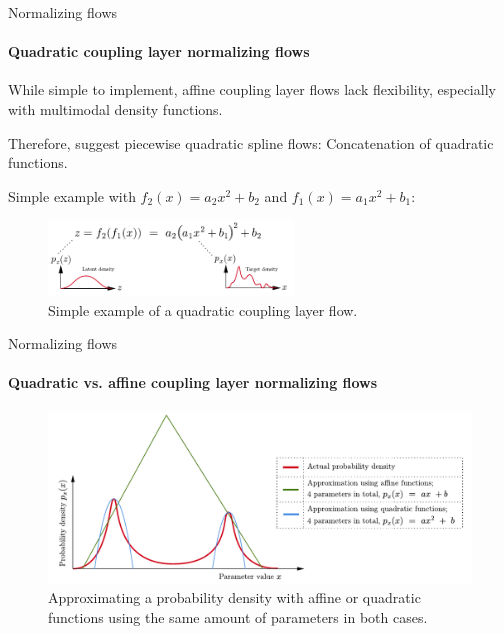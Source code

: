 \documentclass{beamer}
\begin{document}
\begin{frame}[allowframebreaks]{Normalizing flows}
	\framesubtitle{Quadratic coupling layer normalizing flows}
While simple to implement, affine coupling layer flows lack flexibility, especially with multimodal density functions.

Therefore, \cite[p.4]{Durkan.10.06.2019} suggest piecewise quadratic spline flows: Concatenation of quadratic functions.

Simple example with $f_2(x) = a_2x^2 + b_2$ and $f_1(x) = a_1x^2 + b_1$:
\begin{figure}
    \centering
    \includegraphics[height=2cm]{figures/presentation/qcl_flows.pdf}
    \caption{Simple example of a quadratic coupling layer flow.}
    \label{fig:qcl_flows}
\end{figure}
\end{frame}

\begin{frame}[allowframebreaks]{Normalizing flows}
	\framesubtitle{Quadratic vs. affine coupling layer normalizing flows}
\begin{figure}[h]
	\centering
	\includegraphics[width=\textwidth]{figures/presentation/affinevsquadratic.pdf}
	\caption{Approximating a probability density with affine or quadratic functions using the same amount of parameters in both cases.}
	\label{fig:affinevsquadratic}
\end{figure}
\end{frame}
\end{document}
